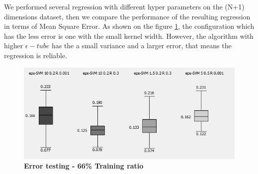 We performed several regression with different hyper parameters on the (N+1) dimensions dataset, then we compare the performance of the resulting regression in terms of Mean Square Error. 
As shown on the figure \ref{fig:quantitative_svr}, the configuration which has the less error is one with the small kernel width. However, the algorithm with higher $\epsilon-tube$ has the a small variance and a larger error, that means the regression is reliable.
\begin{figure}[!ht]
\centering
\includegraphics[height=0.15\textheight]{./regression/MSE_quantitative_66.png}
\caption{\bf Error testing - 66\% Training ratio}
\label{fig:quantitative_svr}
\end{figure}
